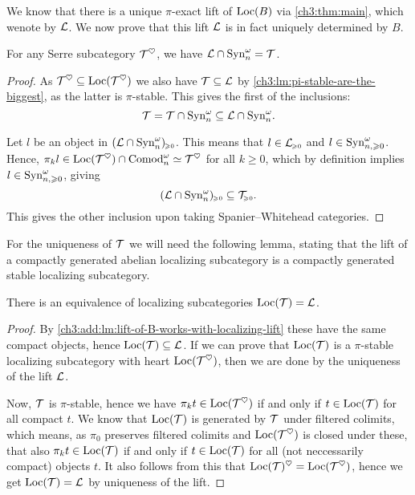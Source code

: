 We know that there is a unique $\pi$-exact lift of $\operatorname{Loc}(B)$ via \cref{ch3:thm:main}, which wenote by $\mathcal{L}$. We now prove that this lift $\mathcal{L}$ is in fact uniquely determined by $B$. 

\begin{lemma}
    \label{ch3:add:lm:lift-of-B-works-with-localizing-lift}
    For any Serre subcategory $\mathcal{T}^\heartsuit$, we have $\mathcal{L}\cap \mathrm{Syn}_{n}^\omega = \mathcal{T}$. 
\end{lemma}
\begin{proof}
    As $\mathcal{T}^\heartsuit \subseteq \operatorname{Loc}(\mathcal{T}^\heartsuit)$ we also have $\mathcal{T} \subseteq \mathcal{L}$ by \cref{ch3:lm:pi-stable-are-the-biggest}, as the latter is $\pi$-stable. This gives the first of the inclusions:
    \[\mathcal{T} = \mathcal{T} \cap \mathrm{Syn}_{n}^\omega\subseteq \mathcal{L} \cap \mathrm{Syn}_{n}^\omega.\]
    
    Let $l$ be an object in $(\mathcal{L}\cap \mathrm{Syn}_{n}^\omega)_{\hspace{-1pt}\scriptscriptstyle\geqslant 0}$. This means that $l\in \mathcal{L}_{\hspace{-1pt}\scriptscriptstyle\geqslant 0}$ and $l \in \mathrm{Syn}_{n, \geqslant 0}^\omega$. Hence, $\pi_k l \in \operatorname{Loc}(\mathcal{T}^\heartsuit)\cap \mathrm{Comod}_n^\omega \simeq \mathcal{T}^\heartsuit$ for all $k\geq 0$, which by definition implies $l \in \mathrm{Syn}_{n, \geqslant 0}^\omega$, giving 
    \[(\mathcal{L}\cap \mathrm{Syn}_{n}^\omega)_{\hspace{-1pt}\scriptscriptstyle\geqslant 0} \subseteq \mathcal{T}_{\hspace{-1pt}\scriptscriptstyle\geqslant 0}.\]
    This gives the other inclusion upon taking Spanier--Whitehead categories. 
\end{proof}


For the uniqueness of $\mathcal{T}$ we will need the following lemma, stating that the lift of a compactly generated abelian localizing subcategory is a compactly generated stable localizing subcategory. 

\begin{lemma}
    \label{ch3:add:lm:loc-of-lift-is-localizing-lift}
    There is an equivalence of localizing subcategories $\operatorname{Loc}(\mathcal{T}) = \mathcal{L}$. 
\end{lemma}
\begin{proof}
    By \cref{ch3:add:lm:lift-of-B-works-with-localizing-lift} these have the same compact objects, hence $\operatorname{Loc}(\mathcal{T})\subseteq \mathcal{L}$. If we can prove that $\operatorname{Loc}(\mathcal{T})$ is a $\pi$-stable localizing subcategory with heart $\operatorname{Loc}(\mathcal{T}^\heartsuit)$, then we are done by the uniqueness of the lift $\mathcal{L}$. 

    Now, $\mathcal{T}$ is $\pi$-stable, hence we have $\pi_k t \in \operatorname{Loc}(\mathcal{T}^\heartsuit)$ if and only if $t\in \operatorname{Loc}(\mathcal{T})$ for all compact $t$. We know that $\operatorname{Loc}(\mathcal{T})$ is generated by $\mathcal{T}$ under filtered colimits, which means, as $\pi_0$ preserves filtered colimits and $\operatorname{Loc}(\mathcal{T}^\heartsuit)$ is closed under these, that also $\pi_k t\in \operatorname{Loc}(\mathcal{T})$ if and only if $t\in \operatorname{Loc}(\mathcal{T})$ for all (not neccessarily compact) objects $t$. It also follows from this that $\operatorname{Loc}(\mathcal{T})^\heartsuit = \operatorname{Loc}(\mathcal{T}^\heartsuit)$, hence we get $\operatorname{Loc}(\mathcal{T}) = \mathcal{L}$ by uniqueness of the lift. 
\end{proof}

